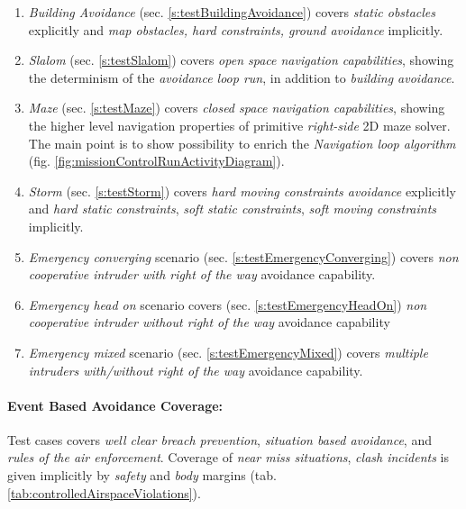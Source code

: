 \begin{enumerate}
    \item \emph{Building Avoidance} (sec. \ref{s:testBuildingAvoidance}) covers \emph{static obstacles} explicitly and \emph{map obstacles, hard constraints, ground avoidance} implicitly.
    \item \emph{Slalom} (sec. \ref{s:testSlalom}) covers \emph{open space navigation capabilities}, showing the determinism of the \emph{avoidance loop run}, in addition to \emph{building avoidance}.
    \item \emph{Maze} (sec. \ref{s:testMaze}) covers \emph{closed space navigation capabilities}, showing the higher level navigation properties of primitive \emph{right-side} 2D maze solver. The main point is to show possibility to enrich the \emph{Navigation loop algorithm} (fig. \ref{fig:missionControlRunActivityDiagram}).
    \item \emph{Storm} (sec. \ref{s:testStorm}) covers \emph{hard moving constraints avoidance} explicitly and \emph{hard static constraints}, \emph{soft static constraints}, \emph{soft moving constraints} implicitly.
    \item \emph{Emergency converging} scenario (sec. \ref{s:testEmergencyConverging}) covers \emph{non cooperative intruder with right of the way} avoidance capability.
    \item \emph{Emergency head on} scenario covers (sec. \ref{s:testEmergencyHeadOn}) \emph{non cooperative intruder without right of the way} avoidance capability
    \item \emph{Emergency mixed} scenario (sec. \ref{s:testEmergencyMixed}) covers \emph{multiple intruders with/without right of the way} avoidance capability.
\end{enumerate}

\paragraph{Event Based Avoidance Coverage:} Test cases covers \emph{well clear breach prevention}, \emph{situation based avoidance}, and \emph{rules of the air enforcement}. Coverage of \emph{near miss situations}, \emph{clash incidents} is given implicitly by \emph{safety} and \emph{body} margins (tab. \ref{tab:controlledAirspaceViolations}).

